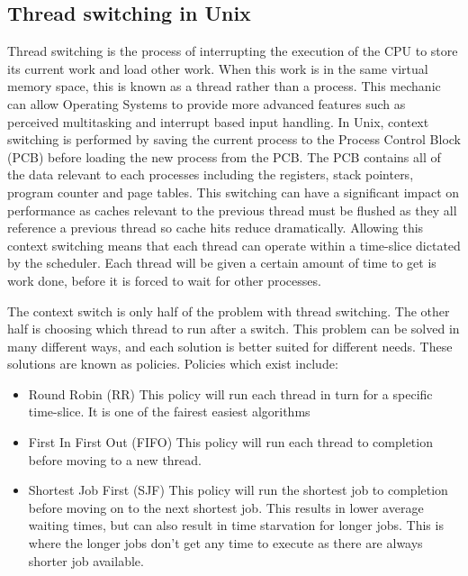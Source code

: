 \subsection{Thread switching in Unix}
Thread switching is the process of interrupting the execution of the CPU to store its current work and load other work. When this work is in the same virtual memory space, this is known as a thread rather than a process. This mechanic can allow Operating Systems to provide more advanced features such as perceived multitasking and interrupt based input handling. In Unix, context switching is performed by saving the current process to the Process Control Block (PCB) before loading the new process from the PCB. The PCB contains all of the data relevant to each processes including the registers, stack pointers, program counter and page tables. This switching can have a significant impact on performance as caches relevant to the previous thread must be flushed as they all reference a previous thread so cache hits reduce dramatically. Allowing this context switching means that each thread can operate within a time-slice dictated by the scheduler. Each thread will be given a certain amount of time to get is work done, before it is forced to wait for other processes.

The context switch is only half of the problem with thread switching. The other half is choosing which thread to run after a switch. This problem can be solved in many different ways, and each solution is better suited for different needs. These solutions are known as policies. Policies which exist include:

\begin{itemize}
	\item Round Robin (RR)
		  This policy will run each thread in turn for a specific time-slice. It is one of the fairest easiest algorithms
	\item First In First Out (FIFO)
	 	  This policy will run each thread to completion before moving to a new thread. 
	\item Shortest Job First (SJF)
		  This policy will run the shortest job to completion before moving on to the next shortest job. This results in lower average waiting times, but can also result in time starvation for longer jobs. This is where the longer jobs don't get any time to execute as there are always shorter job available. 
\end{itemize}


